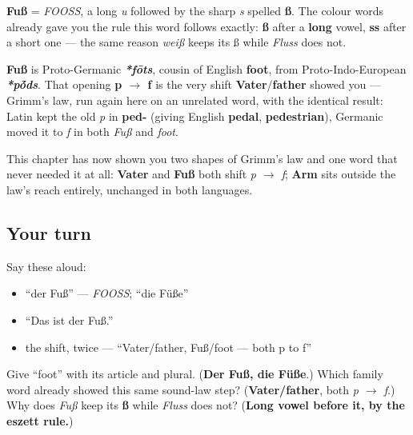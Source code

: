 \begin{sounds}
\textbf{Fuß} = \emph{FOOSS}, a long \emph{u} followed by the sharp \emph{s} spelled \textbf{ß}. The colour words already gave you the rule this word follows exactly: \textbf{ß} after a \textbf{long} vowel, \textbf{ss} after a short one — the same reason \emph{weiß} keeps its ß while \emph{Fluss} does not.
\end{sounds}

\begin{cousinweb}
\textbf{Fuß} is Proto-Germanic \emph{\textbf{*fōts}}, cousin of English \textbf{foot}, from Proto-Indo-European \emph{\textbf{*p\'{\={o}}ds}}. That opening \textbf{p $\to$ f} is the very shift \textbf{Vater}/\textbf{father} showed you — Grimm's law, run again here on an unrelated word, with the identical result: Latin kept the old \emph{p} in \textbf{ped-} (giving English \textbf{pedal}, \textbf{pedestrian}), Germanic moved it to \emph{f} in both \emph{Fuß} and \emph{foot}.

This chapter has now shown you two shapes of Grimm's law and one word that never needed it at all: \textbf{Vater} and \textbf{Fuß} both shift \emph{p $\to$ f}; \textbf{Arm} sits outside the law's reach entirely, unchanged in both languages.
\end{cousinweb}

\subsection*{Your turn}
Say these aloud:

\begin{itemize}
\raggedright
  \item \textquotedblleft{}der Fuß\textquotedblright{} — \emph{FOOSS}; \textquotedblleft{}die Füße\textquotedblright{}
  \item \textquotedblleft{}Das ist der Fuß.\textquotedblright{}
  \item the shift, twice — \textquotedblleft{}Vater/father, Fuß/foot — both p to f\textquotedblright{}
\end{itemize}

\begin{tcolorbox}[breakable,colback=teal!4,colframe=teal!35!black,title={Before you move on}]
Give \textquotedblleft{}foot\textquotedblright{} with its article and plural. (\textbf{Der Fuß, die Füße}.) Which family word already showed this same sound-law step? (\textbf{Vater/father}, both \emph{p $\to$ f}.) Why does \emph{Fuß} keep its \textbf{ß} while \emph{Fluss} does not? (\textbf{Long vowel before it, by the eszett rule.})
\end{tcolorbox}
